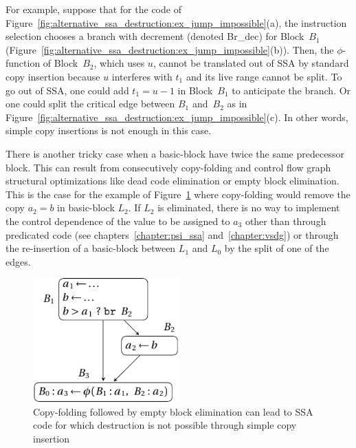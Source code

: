 For example, suppose that for the code of
Figure~\ref{fig:alternative_ssa_destruction:ex_jump_impossible}(a), the instruction selection chooses a branch
with decrement (denoted Br\_dec) for Block~$B_1$
(Figure~\ref{fig:alternative_ssa_destruction:ex_jump_impossible}(b)).  Then, the $\phi$-function of
Block~$B_2$, which uses $u$, cannot be translated out of SSA by standard copy
insertion because $u$ interferes with $t_1$ and its live range cannot be split.
To go out of SSA, one could add $t_1=u-1$ in Block~$B_1$ to anticipate the
branch. Or one could split the critical edge between $B_1$ and~$B_2$ as in
Figure~\ref{fig:alternative_ssa_destruction:ex_jump_impossible}(c). In other words, simple copy insertions is not enough in this case.


There is another tricky case when a basic-block have twice the same predecessor block. This can result from consecutively copy-folding and control flow graph structural optimizations like dead code elimination or empty block elimination. This is the case for the example of Figure~\ref{fig:alternative_ssa_destruction:doublepreds} where copy-folding would remove the copy $a_2=b$ in basic-block $L_2$. If $L_2$ is eliminated, there is no way to implement the control dependence of the value to be assigned to $a_3$ other than through predicated code (see chapters~\ref{chapter:psi_ssa} and~\ref{chapter:vsdg}) or through the re-insertion of a basic-block between $L_1$ and $L_0$ by the split of one of the edges.

\begin{figure}[H]
\includegraphics[width=0.5\textwidth]{doublepreds.pdf}
\caption{\label{fig:alternative_ssa_destruction:doublepreds} Copy-folding followed by empty block elimination can lead to SSA code for which destruction is not possible through simple copy insertion}
\end{figure}

